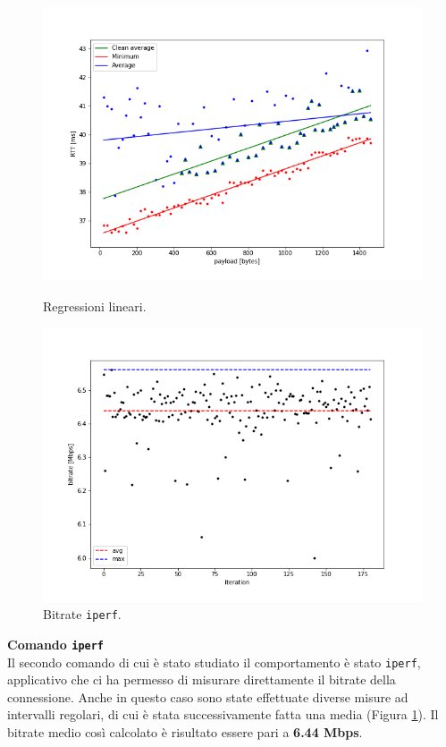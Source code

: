 \documentclass[a4paper,10pt]{article}
\begin{document}
\begin{figure}[!htb]
	\centering
	\begin{minipage}{0.33\textwidth}
     \centering
         \includegraphics[width=1\linewidth]{img/clean.png}
         \caption{Regressioni lineari.}
         \label{fig:regr}
    \end{minipage}
   \begin{minipage}{0.33\textwidth}
     \centering
         \includegraphics[width=1\linewidth]{img/iperf.png}
         \caption{Bitrate \texttt{iperf}.}
         \label{fig:iperf}
   \end{minipage}\hfill
\end{figure}

\noindent
\textbf{Comando \texttt{iperf}}\\
Il secondo comando di cui è stato studiato il comportamento è stato \texttt{iperf}, applicativo che ci ha permesso di misurare direttamente il bitrate della connessione. Anche in questo caso sono state effettuate diverse misure ad intervalli regolari, di cui è stata successivamente fatta una media (Figura \ref{fig:iperf}). Il bitrate medio così calcolato è risultato essere pari a \textbf{6.44 Mbps}.  \\
\end{document}
